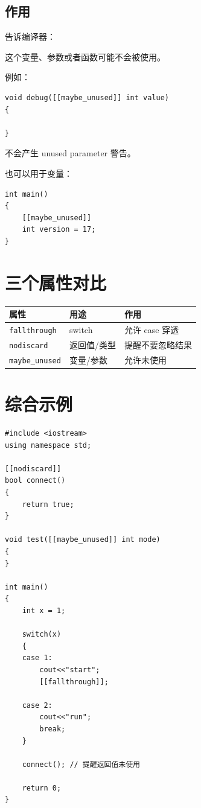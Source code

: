 \documentclass[UTF8,12pt,a4paper]{ctexart}
\begin{document}
\subsection{作用}

告诉编译器：

\begin{center}
这个变量、参数或者函数可能不会被使用。
\end{center}

例如：

\begin{lstlisting}
void debug([[maybe_unused]] int value)
{

}
\end{lstlisting}

不会产生 unused parameter 警告。

也可以用于变量：

\begin{lstlisting}
int main()
{
    [[maybe_unused]]
    int version = 17;
}
\end{lstlisting}

\section{三个属性对比}

\begin{center}
\begin{tabular}{lll}
\toprule
属性 & 用途 & 作用\\
\midrule
\texttt{fallthrough}
& switch
& 允许 case 穿透\\
\texttt{nodiscard}
& 返回值/类型
& 提醒不要忽略结果\\
\texttt{maybe\_unused}
& 变量/参数
& 允许未使用\\
\bottomrule
\end{tabular}
\end{center}

\section{综合示例}

\begin{lstlisting}
#include <iostream>
using namespace std;

[[nodiscard]]
bool connect()
{
    return true;
}

void test([[maybe_unused]] int mode)
{
}

int main()
{
    int x = 1;

    switch(x)
    {
    case 1:
        cout<<"start";
        [[fallthrough]];

    case 2:
        cout<<"run";
        break;
    }

    connect(); // 提醒返回值未使用

    return 0;
}
\end{lstlisting}
\end{document}
